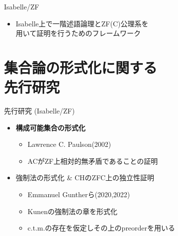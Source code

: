 \documentclass[17pt,aspectratio=169]{beamer}
\begin{document}

\begin{frame}{Isabelle/ZF}
    \begin{itemize}
        \item Isabelle上で一階述語論理とZF(C)公理系を\\用いて証明を行うためのフレームワーク
    \end{itemize}
\end{frame}



\section{集合論の形式化に関する\\先行研究 }

\begin{frame}{先行研究 (Isabelle/ZF)}


    \begin{itemize}
        \vspace{10pt}

        \item \textbf{構成可能集合の形式化}
              {\small \begin{itemize}
                      \item Lawrence C. Paulson(2002)
                      \item ACがZF上相対的無矛盾であることの証明
                  \end{itemize} }

        \item 強制法の形式化 \& CHのZFC上の独立性証明
              {\small \begin{itemize}
                  \item Emmanuel Guntherら(2020,2022)
                  \item Kunenの強制法の章を形式化
                  \item c.t.m.の存在を仮定しその上のpreorderを用いる
              \end{itemize} }

    \end{itemize}
\end{frame}
\end{document}

